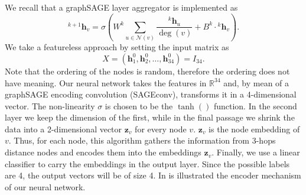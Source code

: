 \documentclass[12pt,a4paper]{report}
\theoremstyle{definition}
\begin{document}
We recall that a graphSAGE layer aggregator is implemented as
\begin{equation*}
    ^{k+1}\mathbf{h}_v = \sigma \left(W^k \sum _{u\in \mathcal{N}(v)} \frac{ ^k \mathbf{h}_u}{\deg (v)} + B^k \cdot {^k \mathbf{h}_v} \right) .
\end{equation*}
We take a featureless approach by setting the input matrix as
\begin{equation*}
    X = \left( \textbf{h}_1 ^0, \textbf{h}_2 ^0, \ldots, \textbf{h}_{34} ^0 \right) = I_{34} .
\end{equation*}
Note that the ordering of the nodes is random, therefore the ordering does not have meaning.
Our neural network takes the features in $\mathbb{R}^{34}$ and, by mean of a graphSAGE encoding convolution (SAGEconv), transforms it in a 4-dimensional vector.
The non-linearity $\sigma$ is chosen to be the $\tanh ()$ function.
In the second layer we keep the dimension of the first, while in the final passage we shrink the data into a 2-dimensional vector $\textbf{z}_v$ for every node $v$.
$\textbf{z}_v$ is the node embedding of $v$.
Thus, for each node, this algorithm gathers the information from 3-hops distance nodes and encodes them into the embeddings $\textbf{z}_v$.
Finally, we use a linear classifier to carry the embeddings in the output layer.
Since the possible labels are 4, the output vectors will be of size 4.
In  is illustrated the encoder mechanism of our neural network.
\end{document}
